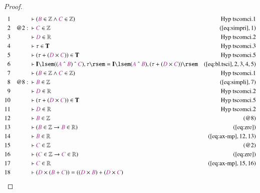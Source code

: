 \begin{proof}
\begin{align}
  1 &&  & \vdash ( \mc{B} \in \mathbb{Z} \wedge \mc{C} \in \mathbb{Z}
      )&\text{Hyp~tscomci.1}\notag%
  \\ 2 && @2:\  & \vdash \mc{C} \in \mathbb{Z}&(\mbox{\ref{eq:simpri}},1)\notag
  \\ 3 &&  & \vdash \mc{D} \in
      \mathbb{R}&\text{Hyp~tscomci.2}\notag%
  \\ 4 &&  & \vdash \tau \in \mathbf{T}&\text{Hyp~tscomci.3}\notag%
  \\ 5 &&  & \vdash ( \tau + ( \mc{D} \times \mc{C} ) ) \in
      \mathbf{T}&\text{Hyp~tscomci.5}\notag%
  \\ 6 &&  & \vdash \mathbf{I} \lsem ( ( \mc{A} ~\string^~ \mc{B} ) ~\string^~
      \mc{C} ) , \tau \rsem = \mathbf{I} \lsem ( \mc{A}
      ~\string^~ \mc{B} ) , ( \tau + ( \mc{D} \times \mc{C}
      ) ) \rsem&(\mbox{\ref{eq:bl.tsci}},2,3,4,5)\notag
  \\ 7 &&  & \vdash ( \mc{B} \in \mathbb{Z} \wedge \mc{C} \in \mathbb{Z}
      )&\text{Hyp~tscomci.1}\notag%
  \\ 8 && @8:\  & \vdash \mc{B} \in \mathbb{Z}&(\mbox{\ref{eq:simpli}},7)\notag
  \\ 9 &&  & \vdash \mc{D} \in
      \mathbb{R}&\text{Hyp~tscomci.2}\notag%
  \\ 10 &&  & \vdash ( \tau + ( \mc{D} \times \mc{C} ) ) \in
      \mathbf{T}&\text{Hyp~tscomci.5}\notag%
  \\ 11 &&  & \vdash \mc{D} \in
      \mathbb{R}&\text{Hyp~tscomci.2}\notag%
  \\ 12 &&  & \vdash \mc{B} \in \mathbb{Z}&(@8)\notag
  \\ 13 &&  & \vdash ( \mc{B} \in \mathbb{Z} \rightarrow \mc{B} \in \mathbb{R}
      )&(\mbox{\ref{eq:zre}})\notag
  \\ 14 &&  & \vdash \mc{B} \in \mathbb{R}&(\mbox{\ref{eq:ax-mp}},12,13)\notag
  \\ 15 &&  & \vdash \mc{C} \in \mathbb{Z}&(@2)\notag
  \\ 16 &&  & \vdash ( \mc{C} \in \mathbb{Z} \rightarrow \mc{C} \in \mathbb{R}
      )&(\mbox{\ref{eq:zre}})\notag
  \\ 17 &&  & \vdash \mc{C} \in \mathbb{R}&(\mbox{\ref{eq:ax-mp}},15,16)\notag
  \\ 18 &&  & \vdash ( \mc{D} \times ( \mc{B} + \mc{C} ) ) = ( ( \mc{D} \times
      \mc{B} ) + ( \mc{D} \times \mc{C} )

\end{align}
\end{proof}
